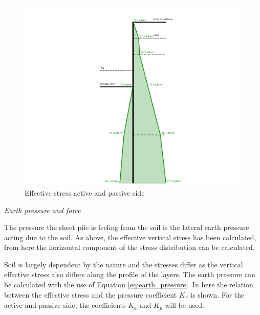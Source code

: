 \begin{figure}[H]
    \centering
    \includegraphics[width=0.70\linewidth]{figures/ch8/effective_stress.png}
    \caption{Effective stress active and passive side}
    \label{fig:effective_stress}
\end{figure}


\textit{Earth pressure and force}

The pressure the sheet pile is feeling from the soil is the lateral earth pressure acting due to the soil. As above, the effective vertical stress has been calculated, from here the horizontal component of the stress distribution can be calculated.

Soil is largely dependent by the nature and the stresses differ as the vertical effective stress also differs along the profile of the layers. The earth pressure can be calculated with the use of Equation \ref{eq:earth_pressure}. In here the relation between the effective stress and the pressure coefficient $K_{\gamma}$ is shown. For the active and passive side, the coefficients $K_{a}$ and $K_{p}$ will be used.

